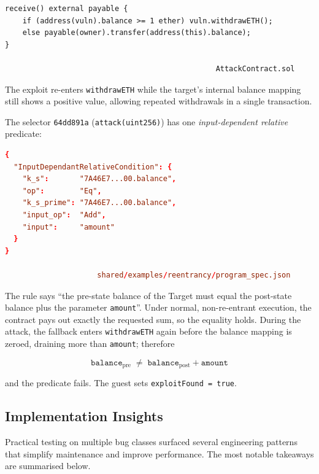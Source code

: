 \begin{lstlisting}[caption={[AttackContract.sol]},label={lst:attack},language=Solidity]
receive() external payable {
    if (address(vuln).balance >= 1 ether) vuln.withdrawETH();
    else payable(owner).transfer(address(this).balance);
}

                                                AttackContract.sol
\end{lstlisting}


The exploit re-enters \texttt{withdrawETH} while the target’s internal balance mapping still shows a positive value, allowing repeated withdrawals in a single transaction.

The selector \texttt{64dd891a} (\texttt{attack(uint256)}) has one
\textit{input-dependent relative} predicate:

\begin{lstlisting}[caption={[Predicate for attack]},language=toml]
{
  "InputDependantRelativeCondition": {
    "k_s":       "7A46E7...00.balance",
    "op":        "Eq",
    "k_s_prime": "7A46E7...00.balance",
    "input_op":  "Add",
    "input":     "amount"
  }
}

                     shared/examples/reentrancy/program_spec.json
\end{lstlisting}


The rule says “the pre-state balance of the Target must equal the post-state
balance plus the parameter \texttt{amount}”.  
Under normal, non-re-entrant execution, the contract pays out exactly the requested sum, so the equality holds. During the attack, the fallback enters \texttt{withdrawETH} again before the balance mapping is zeroed, draining more than \texttt{amount}; therefore

\[
\texttt{balance}_{\text{pre}} \;\neq\;
\texttt{balance}_{\text{post}} + \texttt{amount}
\]


and the predicate fails.  The guest sets \texttt{exploitFound = true}.


\subsection{Implementation Insights}

Practical testing on multiple bug classes surfaced several engineering patterns that simplify maintenance and improve performance. The most notable takeaways are summarised below.

